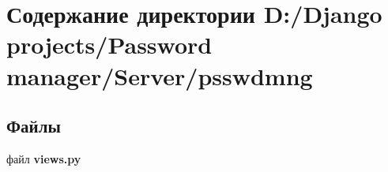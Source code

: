 \section{Содержание директории D\+:/\+Django projects/\+Password manager/\+Server/psswdmng}
\label{dir_b7768ffda0cfc22e6ff19658fa32c2cf}
\subsection*{Файлы}
\begin{DoxyCompactItemize}
\item 
файл {\bfseries views.\+py}
\end{DoxyCompactItemize}
